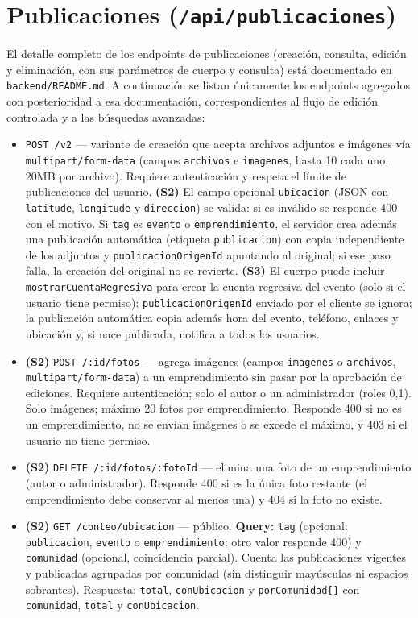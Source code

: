 \section{Publicaciones (\texttt{/api/publicaciones})}
El detalle completo de los endpoints de publicaciones (creación, consulta, edición y eliminación, con sus parámetros de cuerpo y consulta) está documentado en \texttt{backend/README.md}. A continuación se listan únicamente los endpoints agregados con posterioridad a esa documentación, correspondientes al flujo de edición controlada y a las búsquedas avanzadas:
\begin{itemize}
    \item \texttt{POST /v2} — variante de creación que acepta archivos adjuntos e imágenes vía \texttt{multipart/form-data} (campos \texttt{archivos} e \texttt{imagenes}, hasta 10 cada uno, 20MB por archivo). Requiere autenticación y respeta el límite de publicaciones del usuario. \textbf{(S2)} El campo opcional \texttt{ubicacion} (JSON con \texttt{latitude}, \texttt{longitude} y \texttt{direccion}) se valida: si es inválido se responde 400 con el motivo. Si \texttt{tag} es \texttt{evento} o \texttt{emprendimiento}, el servidor crea además una publicación automática (etiqueta \texttt{publicacion}) con copia independiente de los adjuntos y \texttt{publicacionOrigenId} apuntando al original; si ese paso falla, la creación del original no se revierte. \textbf{(S3)} El cuerpo puede incluir \texttt{mostrarCuentaRegresiva} para crear la cuenta regresiva del evento (solo si el usuario tiene permiso); \texttt{publicacionOrigenId} enviado por el cliente se ignora; la publicación automática copia además hora del evento, teléfono, enlaces y ubicación y, si nace publicada, notifica a todos los usuarios.
    \item \textbf{(S2)} \texttt{POST /:id/fotos} — agrega imágenes (campos \texttt{imagenes} o \texttt{archivos}, \texttt{multipart/form-data}) a un emprendimiento sin pasar por la aprobación de ediciones. Requiere autenticación; solo el autor o un administrador (roles 0,1). Solo imágenes; máximo 20 fotos por emprendimiento. Responde 400 si no es un emprendimiento, no se envían imágenes o se excede el máximo, y 403 si el usuario no tiene permiso.
    \item \textbf{(S2)} \texttt{DELETE /:id/fotos/:fotoId} — elimina una foto de un emprendimiento (autor o administrador). Responde 400 si es la única foto restante (el emprendimiento debe conservar al menos una) y 404 si la foto no existe.
    \item \textbf{(S2)} \texttt{GET /conteo/ubicacion} — público. \textbf{Query:} \texttt{tag} (opcional: \texttt{publicacion}, \texttt{evento} o \texttt{emprendimiento}; otro valor responde 400) y \texttt{comunidad} (opcional, coincidencia parcial). Cuenta las publicaciones vigentes y publicadas agrupadas por comunidad (sin distinguir mayúsculas ni espacios sobrantes). Respuesta: \texttt{total}, \texttt{conUbicacion} y \texttt{porComunidad[]} con \texttt{comunidad}, \texttt{total} y \texttt{conUbicacion}.

\end{itemize}
